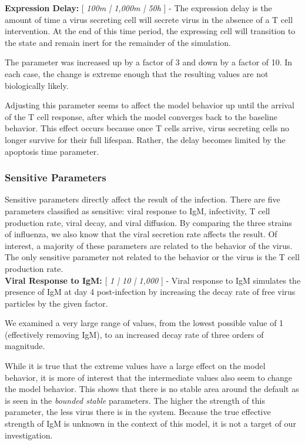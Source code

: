 \documentclass[10pt]{article}
\begin{document}
\textbf{Expression Delay:} [ \textit{100m | 1,000m | 50h} ] - The expression delay is the amount of time a virus secreting cell will secrete virus in the absence of a T cell intervention.  At the end of this time period, the expressing cell will transition to the  state and remain inert for the remainder of the simulation.

The parameter was increased up by a factor of 3 and down by a factor of 10.  In each case, the change is extreme enough that the resulting values are not biologically likely.  

Adjusting this parameter seems to affect the model behavior up until the arrival of the T cell response, after which the model converges back to the baseline behavior.  This effect occurs because once T cells arrive, virus secreting cells no longer survive for their full lifespan.  Rather, the delay becomes limited by the apoptosis time parameter.  


\subsubsection{Sensitive Parameters}

Sensitive parameters directly affect the result of the infection.  There are five parameters classified as sensitive: viral response to IgM, infectivity, T cell production rate, viral decay, and viral diffusion.  By comparing the three strains of influenza, we also know that the viral secretion rate affects the result.  Of interest, a majority of these parameters are related to the behavior of the virus. The only sensitive parameter not related to the behavior or the virus is the T cell production rate.  \\


\textbf{Viral Response to IgM:} [ \textit{1 | 10 | 1,000} ] - Viral response to IgM simulates the presence of IgM at day 4 post-infection by increasing the decay rate of free virus particles by the given factor.

We examined a very large range of values, from the lowest possible value of 1 (effectively removing IgM), to an increased decay rate of three orders of magnitude.

While it is true that the extreme values have a large effect on the model behavior, it is more of interest that the intermediate values also seem to change the model behavior.  This shows that there is no stable area around the default as is seen in the \textit{bounded stable} parameters.  The higher the strength of this parameter, the less virus there is in the system.  Because the true effective strength of IgM is unknown in the context of this model, it is not a target of our investigation. \\
\end{document}
